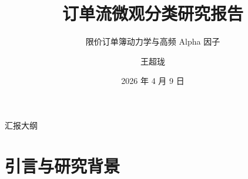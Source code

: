 \documentclass[10pt,aspectratio=169]{beamer}
\title{订单流微观分类研究报告}
\subtitle{限价订单簿动力学与高频 Alpha 因子}
\date{2026 年 4 月 9 日}
\author{王超珑}
\institute{JinYi Capital}
\begin{document}
\maketitle

\begin{frame}{汇报大纲}
  \tableofcontents[hideallsubsections]
\end{frame}

\section{引言与研究背景}






\end{document}
